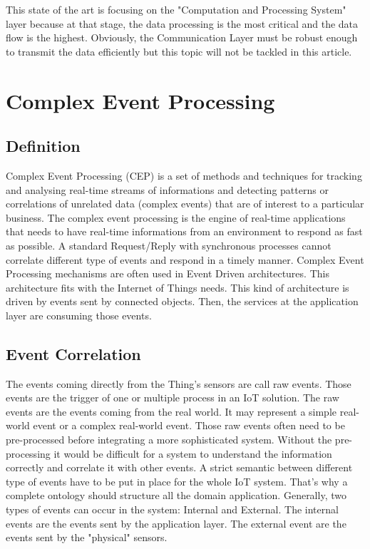 \documentclass[11pt]{article}
\begin{document}
This state of the art is focusing on the "Computation and Processing System" layer because at that stage, the data processing is the most critical and the data flow is the highest. Obviously, the Communication Layer must be robust enough to transmit the data efficiently but this topic will not be tackled in this article.


\section{Complex Event Processing}

\subsection{Definition}

Complex Event Processing (CEP) is a set of methods and techniques for tracking
and analysing real-time streams of informations and detecting patterns or correlations
of unrelated data (complex events) that are of interest to a particular
business. \cite{1} The complex event processing is the engine of real-time applications that needs to have real-time informations from an environment to respond as fast as possible. A standard Request/Reply with synchronous processes cannot correlate different type of events and respond in a timely manner. Complex Event Processing mechanisms are often used in Event Driven architectures. This architecture fits with the Internet of Things needs. This kind of architecture is driven by events sent by connected objects. Then, the services at the application layer are consuming those events.

\subsection{Event Correlation}

The events coming directly from the Thing's sensors are call raw events. Those events are the trigger of one or multiple process in an IoT solution. The raw events are the events coming from the real world. It may represent a simple real-world event or a complex real-world event. Those raw events often need to be pre-processed before integrating a more sophisticated system. Without the pre-processing it would be difficult for a system to understand the information correctly and correlate it with other events. A strict semantic between different type of events have to be put in place for the whole IoT system. That's why a complete ontology should structure all the domain application. Generally, two types of events can occur in the system: Internal and External. The internal events are the events sent by the application layer. The external event are the events sent by the "physical" sensors.
\end{document}
